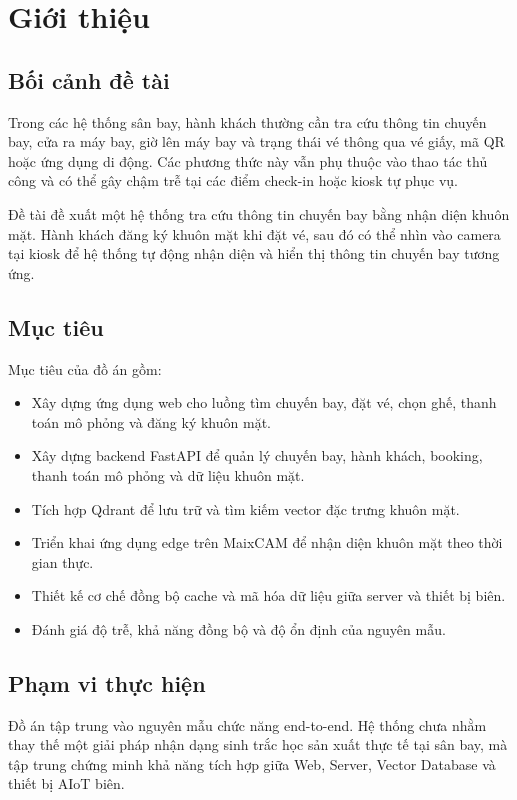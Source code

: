 \section{Giới thiệu}

\subsection{Bối cảnh đề tài}
Trong các hệ thống sân bay, hành khách thường cần tra cứu thông tin chuyến bay, cửa ra máy bay, giờ lên máy bay và trạng thái vé thông qua vé giấy, mã QR hoặc ứng dụng di động. Các phương thức này vẫn phụ thuộc vào thao tác thủ công và có thể gây chậm trễ tại các điểm check-in hoặc kiosk tự phục vụ.

Đề tài đề xuất một hệ thống tra cứu thông tin chuyến bay bằng nhận diện khuôn mặt. Hành khách đăng ký khuôn mặt khi đặt vé, sau đó có thể nhìn vào camera tại kiosk để hệ thống tự động nhận diện và hiển thị thông tin chuyến bay tương ứng.

\subsection{Mục tiêu}
Mục tiêu của đồ án gồm:

\begin{itemize}
  \item Xây dựng ứng dụng web cho luồng tìm chuyến bay, đặt vé, chọn ghế, thanh toán mô phỏng và đăng ký khuôn mặt.
  \item Xây dựng backend FastAPI để quản lý chuyến bay, hành khách, booking, thanh toán mô phỏng và dữ liệu khuôn mặt.
  \item Tích hợp Qdrant để lưu trữ và tìm kiếm vector đặc trưng khuôn mặt.
  \item Triển khai ứng dụng edge trên MaixCAM để nhận diện khuôn mặt theo thời gian thực.
  \item Thiết kế cơ chế đồng bộ cache và mã hóa dữ liệu giữa server và thiết bị biên.
  \item Đánh giá độ trễ, khả năng đồng bộ và độ ổn định của nguyên mẫu.
\end{itemize}

\subsection{Phạm vi thực hiện}
Đồ án tập trung vào nguyên mẫu chức năng end-to-end. Hệ thống chưa nhằm thay thế một giải pháp nhận dạng sinh trắc học sản xuất thực tế tại sân bay, mà tập trung chứng minh khả năng tích hợp giữa Web, Server, Vector Database và thiết bị AIoT biên.

